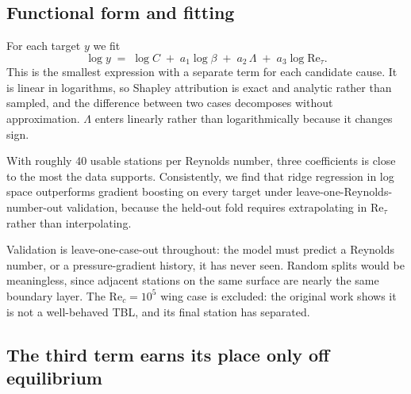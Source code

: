\documentclass[11pt,a4paper]{article}
\newcommand{\Rec}{\mathrm{Re}_c}
\newcommand{\Ret}{\mathrm{Re}_\tau}
\begin{document}
\subsection{Functional form and fitting}

For each target $y$ we fit
\begin{equation}
  \log y \;=\; \log C \;+\; a_1 \log\beta \;+\; a_2\,\Lambda
  \;+\; a_3 \log\Ret .
  \label{eq:law}
\end{equation}
This is the smallest expression with a separate term for each candidate
cause. It is linear in logarithms, so Shapley attribution is exact and
analytic rather than sampled, and the difference between two cases
decomposes without approximation. $\Lambda$ enters linearly rather than
logarithmically because it changes sign.

With roughly 40 usable stations per Reynolds number, three coefficients is
close to the most the data supports. Consistently, we find that ridge
regression in log space outperforms gradient boosting on every target under
leave-one-Reynolds-number-out validation, because the held-out fold requires
extrapolating in $\Ret$ rather than interpolating.

Validation is leave-one-case-out throughout: the model must predict a
Reynolds number, or a pressure-gradient history, it has never seen. Random
splits would be meaningless, since adjacent stations on the same surface are
nearly the same boundary layer. The $\Rec = 10^5$ wing case is excluded: the
original work shows it is not a well-behaved TBL, and its final station has
separated.

\subsection{The third term earns its place only off equilibrium}
\end{document}
